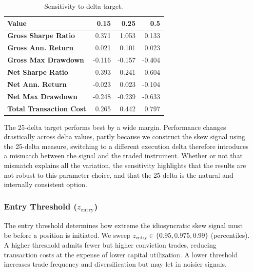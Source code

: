 \documentclass[12pt, a4paper]{article}
\begin{document}
\begin{table}[h]
\centering
\caption{Sensitivity to delta target.}
\label{tab:delta_sens}
\begin{tabular}{lrrr}
\toprule
Value & 0.15 & 0.25 & 0.5 \\
\midrule
\textbf{Gross Sharpe Ratio} & 0.371 & 1.053 & 0.133 \\
\textbf{Gross Ann. Return} & 0.021 & 0.101 & 0.023 \\
\textbf{Gross Max Drawdown} & -0.116 & -0.157 & -0.404 \\
\textbf{Net Sharpe Ratio} & -0.393 & 0.241 & -0.604 \\
\textbf{Net Ann. Return} & -0.023 & 0.023 & -0.104 \\
\textbf{Net Max Drawdown} & -0.248 & -0.239 & -0.633 \\
\textbf{Total Transaction Cost} & 0.265 & 0.442 & 0.797 \\
\bottomrule
\end{tabular}
\end{table}



The 25-delta target performs best by a wide margin. Performance changes drastically across delta values, partly because we construct the skew signal using the 25-delta measure, switching to a different execution delta therefore introduces a mismatch between the signal and the traded instrument. Whether or not that mismatch explains all the variation, the sensitivity highlights that the results are not robust to this parameter choice, and that the 25-delta is the natural and internally consistent option.

\subsubsection{Entry Threshold ($z_{\mathrm{entry}}$)}

The entry threshold determines how extreme the idiosyncratic skew signal must be before a position is initiated. We sweep $z_{\mathrm{entry}} \in \{0.95, 0.975, 0.99\}$ (percentiles). A higher threshold admits fewer but higher conviction trades, reducing transaction costs at the expense of lower capital utilization. A lower threshold increases trade frequency and diversification but may let in noisier signals.
\end{document}
